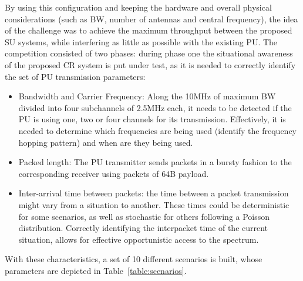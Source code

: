 By using this configuration and keeping the hardware and overall physical considerations (such as \ac{BW}, number of antennas and central frequency),
the idea of the challenge was to achieve the maximum throughput between the proposed \ac{SU} systems, while interfering as little as possible with the existing \ac{PU}. The competition consisted of two phases: during phase one the situational awareness of the proposed \ac{CR} system is put under test, as it is needed to correctly identify the set of \ac{PU} transmission parameters:

\begin{itemize}
    \item Bandwidth and Carrier Frequency: Along the 10MHz of maximum \ac{BW} divided into four subchannels of 2.5MHz each, it needs to be detected if the \ac{PU} is using one, two or four channels for its transmission. Effectively, it is needed to determine which frequencies are being used (identify the frequency hopping pattern) and when are they being used.
    \item Packed length: The \ac{PU} transmitter sends packets in a bursty fashion to the corresponding receiver using packets of 64B payload.
    \item Inter-arrival time between packets: the time between a packet transmission might vary from a situation to another. These times could be deterministic for some scenarios, as well as stochastic for others following a Poisson distribution. Correctly identifying the interpacket time of the current situation, allows for effective opportunistic access to the spectrum.
\end{itemize}

With these characteristics, a set of 10 different scenarios is built, whose parameters are depicted in Table~\ref{table:scenarios}.

